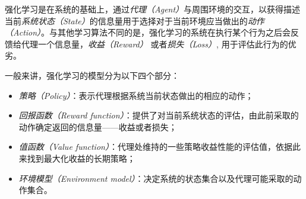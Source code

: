\documentclass{IEEEtran}
\begin{document}
%
%
%


强化学习是在系统的基础上，通过\emph{代理（Agent）}与周围环境的交互，以获得描述当前\emph{系统状态（State）}的信息量用于选择对于当前环境应当做出的\emph{动作（Action）}。与其他学习算法不同的是，强化学习的系统在执行某个行为之后会反馈给代理一个信息量，\emph{收益（Reward）} 或者\emph{损失（Loss）}, 用于评估此行为的优劣\cite{Sutton1998}。

一般来讲，强化学习的模型分为以下四个部分：
\begin{itemize}
\item \emph{策略（Policy）}：表示代理根据系统当前状态做出的相应的动作；
\item \emph{回报函数（Reward function）}：提供了对当前系统状态的评估，由此前采取的动作确定返回的信息量——收益或者损失；
\item \emph{值函数（Value function）}：代理处维持的一些策略收益性能的评估值，依据此来找到最大化收益的长期策略；
\item \emph{环境模型（Environment model）}：决定系统的状态集合以及代理可能采取的动作集合。
\end{itemize}
\end{document}
